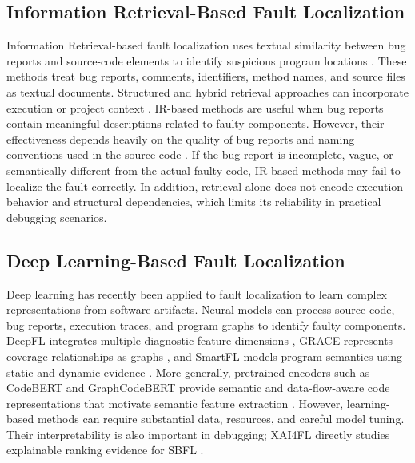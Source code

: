 \documentclass[article,article,submit,pdftex,moreauthors]{Definitions/mdpi}
\begin{document}
\subsection{Information Retrieval-Based Fault Localization}

Information Retrieval-based fault localization uses textual similarity between bug reports and source-code elements to identify suspicious program locations \cite{zhou2012buglocator,sisman2012history,saha2013bluir}. These methods treat bug reports, comments, identifiers, method names, and source files as textual documents. Structured and hybrid retrieval approaches can incorporate execution or project context \cite{le2015better,miryeganeh2021globug,chen2022pathidea,yang2024cops,li2021laprob}. IR-based methods are useful when bug reports contain meaningful descriptions related to faulty components. However, their effectiveness depends heavily on the quality of bug reports and naming conventions used in the source code \cite{chaparro2019query,mills2020queries,kim2021trustworthy}. If the bug report is incomplete, vague, or semantically different from the actual faulty code, IR-based methods may fail to localize the fault correctly. In addition, retrieval alone does not encode execution behavior and structural dependencies, which limits its reliability in practical debugging scenarios.

\subsection{Deep Learning-Based Fault Localization}

Deep learning has recently been applied to fault localization to learn complex representations from software artifacts. Neural models can process source code, bug reports, execution traces, and program graphs to identify faulty components. DeepFL integrates multiple diagnostic feature dimensions \cite{li2019deepfl}, GRACE represents coverage relationships as graphs \cite{lou2021grace}, and SmartFL models program semantics using static and dynamic evidence \cite{zeng2022smartfl}. More generally, pretrained encoders such as CodeBERT and GraphCodeBERT provide semantic and data-flow-aware code representations that motivate semantic feature extraction \cite{feng2020codebert,guo2021graphcodebert}. However, learning-based methods can require substantial data, resources, and careful model tuning. Their interpretability is also important in debugging; XAI4FL directly studies explainable ranking evidence for SBFL \cite{widyasari2022xai4fl}.
\end{document}
